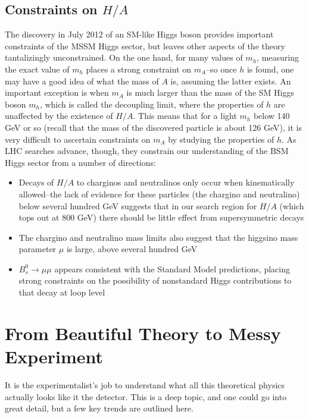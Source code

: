 \subsection{Constraints on $H/A$}
The discovery in July 2012 of an SM-like Higgs boson provides important constraints of the MSSM Higgs sector,
 but leaves other aspects of the theory tantalizingly unconstrained.  On the one hand, 
for many values of $m_h$, measuring the exact value of $m_h$ 
places a strong constraint on $m_A$--so once $h$ is found, one may have a good idea of what the mass of 
$A$ is, assuming the latter exists.  An important exception is when 
$m_A$ is much larger than the mass of the SM Higgs 
boson $m_h$, which is called the decoupling limit, where the 
properties of $h$ are unaffected by the existence of $H/A$.
  This means that for a light $m_h$ below 140 GeV 
or so (recall that the mass of the discovered particle is about 126 GeV),
 it is very difficult to ascertain constraints on $m_A$ by studying the properties of $h$.  
 As LHC searches advance, though, they constrain our understanding of the BSM 
 Higgs sector from a number of directions: 

\begin{itemize}
    \item Decays of $H/A$ to charginos and neutralinos only occur when kinematically 
allowed--the lack of evidence for these particles (the chargino and neutralino) below several hundred GeV suggests
that in our search region for $H/A$ (which tops out at 800 GeV) there should be little
effect from supersymmetric decays
    \item The chargino and neutralino mass limits also suggest that the higgsino mass
parameter $\mu$ is large, above several hundred GeV
    \item $B_s^0\rightarrow\mu\mu$ appears consistent with the Standard Model predictions,
placing strong constraints on the possibility of nonstandard Higgs contributions
to that decay at loop level \cite{bs_to_mumu}
\end{itemize}

\section{From Beautiful Theory to Messy Experiment}

It is the experimentalist's job to understand what all this theoretical physics actually looks like it the detector.  This is a deep topic, and one could go into great detail, but a few key trends are outlined here.

